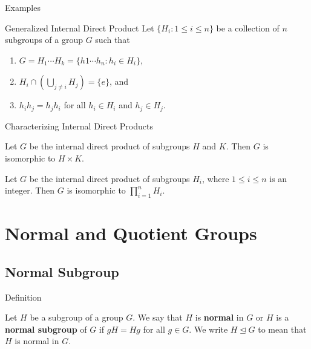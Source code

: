 \documentclass{beamer}
\begin{document}
\begin{frame}{Examples}
    
\end{frame}

\begin{frame}{Generalized Internal Direct Product}
    \justifying
    Let $\{H_i: 1 \leq i \leq n\}$ be a collection of $n$ subgroups of a group $G$ such that
    \begin{enumerate}
        \item $G = H_1\cdots H_k = \{h1\cdots h_n : h_i \in H_i\}$,
        \item $H_i \cap \left(\bigcup_{j \neq i}H_j\right) = \{e\}$, and
        \item $h_ih_j = h_jh_i$ for all $h_i \in H_i$ and $h_j \in H_j$.
    \end{enumerate}
\end{frame}

\begin{frame}{Characterizing Internal Direct Products}
    \begin{theorem}
        \justifying
        Let $G$ be the internal direct product of subgroups $H$ and $K$. Then $G$ is isomorphic to $H \times K$.
    \end{theorem}
    \pause
    \begin{theorem}
        \justifying
        Let $G$ be the internal direct product of subgroups $H_i$, where $1 \leq i \leq n$ is an integer. Then $G$ is isomorphic to $\prod_{i=1}^nH_i$. 
    \end{theorem}
\end{frame}

\section{Normal and Quotient Groups}

\subsection{Normal Subgroup}

\begin{frame}{Definition}
\begin{definition}
\justifying
Let $H$ be a subgroup of a group $G$. We say that $H$ is \textbf{normal} in $G$ or $H$ is a \textbf{normal subgroup} of $G$ if $gH = Hg$ for all $g \in G$. We write $H \unlhd G$ to mean that $H$ is normal in $G$.
\end{definition}
\end{frame}
\end{document}

